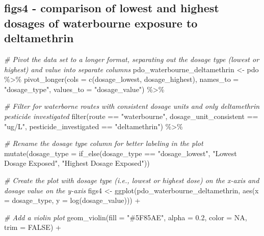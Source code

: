 \documentclass[
]{article}
\newenvironment{Shaded}{\begin{snugshade}}{\end{snugshade}}
\newcommand{\AttributeTok}[1]{\textcolor[rgb]{0.77,0.63,0.00}{#1}}
\newcommand{\CommentTok}[1]{\textcolor[rgb]{0.56,0.35,0.01}{\textit{#1}}}
\newcommand{\ConstantTok}[1]{\textcolor[rgb]{0.00,0.00,0.00}{#1}}
\newcommand{\FloatTok}[1]{\textcolor[rgb]{0.00,0.00,0.81}{#1}}
\newcommand{\FunctionTok}[1]{\textcolor[rgb]{0.00,0.00,0.00}{#1}}
\newcommand{\NormalTok}[1]{#1}
\newcommand{\OtherTok}[1]{\textcolor[rgb]{0.56,0.35,0.01}{#1}}
\newcommand{\SpecialCharTok}[1]{\textcolor[rgb]{0.00,0.00,0.00}{#1}}
\newcommand{\StringTok}[1]{\textcolor[rgb]{0.31,0.60,0.02}{#1}}
\begin{document}
\hypertarget{figs4---comparison-of-lowest-and-highest-dosages-of-waterbourne-exposure-to-deltamethrin}{%
\subsection{figs4 - comparison of lowest and highest dosages of
waterbourne exposure to
deltamethrin}\label{figs4---comparison-of-lowest-and-highest-dosages-of-waterbourne-exposure-to-deltamethrin}}

\begin{Shaded}
\begin{Highlighting}[]
\CommentTok{\# Pivot the data set to a longer format, separating out the dosage type (lowest or highest) and value into separate columns}
\NormalTok{pdo\_waterbourne\_deltamethrin }\OtherTok{\textless{}{-}}\NormalTok{ pdo }\SpecialCharTok{\%\textgreater{}\%}
  \FunctionTok{pivot\_longer}\NormalTok{(}\AttributeTok{cols =} \FunctionTok{c}\NormalTok{(dosage\_lowest, dosage\_highest), }
               \AttributeTok{names\_to =} \StringTok{"dosage\_type"}\NormalTok{,}
               \AttributeTok{values\_to =} \StringTok{"dosage\_value"}\NormalTok{) }\SpecialCharTok{\%\textgreater{}\%} 
  
  \CommentTok{\# Filter for waterborne routes with consistent dosage units and only deltamethrin pesticide investigated}
  \FunctionTok{filter}\NormalTok{(route }\SpecialCharTok{==} \StringTok{"waterbourne"}\NormalTok{, dosage\_unit\_consistent }\SpecialCharTok{==} \StringTok{"ug/L"}\NormalTok{, pesticide\_investigated }\SpecialCharTok{==} \StringTok{"deltamethrin"}\NormalTok{) }\SpecialCharTok{\%\textgreater{}\%} 

  \CommentTok{\# Rename the dosage type column for better labeling in the plot}
  \FunctionTok{mutate}\NormalTok{(}\AttributeTok{dosage\_type =} \FunctionTok{if\_else}\NormalTok{(dosage\_type }\SpecialCharTok{==} \StringTok{"dosage\_lowest"}\NormalTok{, }\StringTok{"Lowest Dosage Exposed"}\NormalTok{, }\StringTok{"Highest Dosage Exposed"}\NormalTok{))}

\CommentTok{\# Create the plot with dosage type (i.e., lowest or highest dose) on the x{-}axis and dosage value on the y{-}axis}
\NormalTok{figs4 }\OtherTok{\textless{}{-}} \FunctionTok{ggplot}\NormalTok{(pdo\_waterbourne\_deltamethrin, }\FunctionTok{aes}\NormalTok{(}\AttributeTok{x =}\NormalTok{ dosage\_type, }\AttributeTok{y =} \FunctionTok{log}\NormalTok{(dosage\_value))) }\SpecialCharTok{+}
  
  \CommentTok{\# Add a violin plot }
  \FunctionTok{geom\_violin}\NormalTok{(}\AttributeTok{fill =} \StringTok{"\#5F85AE"}\NormalTok{, }\AttributeTok{alpha =} \FloatTok{0.2}\NormalTok{, }\AttributeTok{color =} \ConstantTok{NA}\NormalTok{, }\AttributeTok{trim =} \ConstantTok{FALSE}\NormalTok{) }\SpecialCharTok{+}
  

\end{Highlighting}
\end{Shaded}
\end{document}
